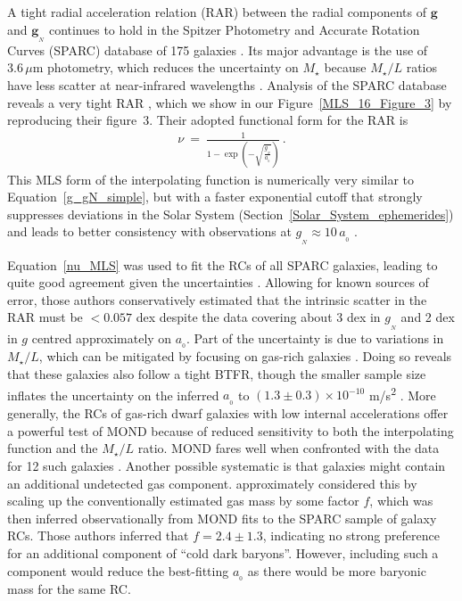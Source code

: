 \documentclass[fleqn,usenatbib,useAMS,onecolumn]{mnras} %
\begin{document}
A tight radial acceleration relation (RAR) between the radial components of $\bm{g}$ and $\bm{g}_{_N}$ continues to hold in the Spitzer Photometry and Accurate Rotation Curves (SPARC) database of 175 galaxies \citep*{SPARC}. Its major advantage is the use of $3.6\,\mu$m photometry, which reduces the uncertainty on $M_{\star}$ because $M_{\star}/L$ ratios have less scatter at near-infrared wavelengths \citep{Bell_2001, Norris_2016}. Analysis of the SPARC database reveals a very tight RAR \citep{McGaugh_Lelli_2016}, which we show in our Figure~\ref{MLS_16_Figure_3} by reproducing their figure~3. Their adopted functional form for the RAR is
\begin{eqnarray}
	\nu ~=~ \frac{1}{1 - \exp \left( -\sqrt{\frac{g_{_N}}{a_{_0}}} \right)} \, .
	\label{nu_MLS}
\end{eqnarray}
This MLS form of the interpolating function is numerically very similar to Equation~\ref{g_gN_simple}, but with a faster exponential cutoff that strongly suppresses deviations in the Solar System (Section~\ref{Solar_System_ephemerides}) and leads to better consistency with observations at $g_{_N} \approx 10 \, a_{_0}$ \citep{Tian_2019}.

Equation~\ref{nu_MLS} was used to fit the RCs of all SPARC galaxies, leading to quite good agreement given the uncertainties \citep{Li_2018}. Allowing for known sources of error, those authors conservatively estimated that the intrinsic scatter in the RAR must be $< 0.057$ dex despite the data covering about 3 dex in $g_{_N}$ and 2 dex in $g$ centred approximately on $a_{_0}$. Part of the uncertainty is due to variations in $M_{\star}/L$, which can be mitigated by focusing on gas-rich galaxies \citep{Draine_2011}. Doing so reveals that these galaxies also follow a tight BTFR, though the smaller sample size inflates the uncertainty on the inferred $a_{_0}$ to $\left( 1.3 \pm 0.3 \right) \times 10^{-10}$ m/s\textsuperscript{2} \citep{McGaugh_2012}. More generally, the RCs of gas-rich dwarf galaxies with low internal accelerations offer a powerful test of MOND because of reduced sensitivity to both the interpolating function and the $M_{\star}/L$ ratio. MOND fares well when confronted with the data for 12 such galaxies \citep{Sanders_2019}. Another possible systematic is that galaxies might contain an additional undetected gas component. \citet*{Ghari_2019_gas} approximately considered this by scaling up the conventionally estimated gas mass by some factor $f$, which was then inferred observationally from MOND fits to the SPARC sample of galaxy RCs. Those authors inferred that $f = 2.4 \pm 1.3$, indicating no strong preference for an additional component of ``cold dark baryons''. However, including such a component would reduce the best-fitting $a_{_0}$ as there would be more baryonic mass for the same RC.
\end{document}
